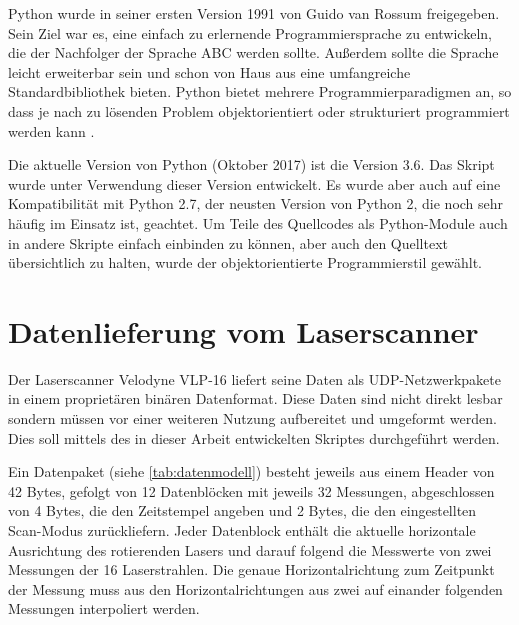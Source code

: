 \documentclass[a4paper,12pt,bibliography=totoc, listof=totoc,titlepage,pointlessnumbers]{scrreprt}
\begin{document}
Python wurde in seiner ersten Version 1991 von Guido van Rossum freigegeben. Sein Ziel war es, eine einfach zu erlernende Programmiersprache zu entwickeln, die der Nachfolger der Sprache ABC werden sollte. Außerdem sollte die Sprache leicht erweiterbar sein und schon von Haus aus eine umfangreiche Standardbibliothek bieten. Python bietet mehrere Programmierparadigmen an, so dass je nach zu lösenden Problem objektorientiert oder strukturiert programmiert werden kann \citep[S. 14]{python}.

Die aktuelle Version von Python (Oktober 2017) ist die Version 3.6. Das Skript wurde unter Verwendung dieser Version entwickelt. Es wurde aber auch auf eine Kompatibilität mit Python 2.7, der neusten Version von Python 2, die noch sehr häufig im Einsatz ist, geachtet. Um Teile des Quellcodes als Python-Module auch in andere Skripte einfach einbinden zu können, aber auch den Quelltext übersichtlich zu halten, wurde der objektorientierte Programmierstil gewählt.

\section{Datenlieferung vom Laserscanner}
\label{ss:Datenlieferung}
Der Laserscanner Velodyne VLP-16 liefert seine Daten als UDP-Netzwerkpakete in einem proprietären binären Datenformat. Diese Daten sind nicht direkt lesbar sondern müssen vor einer weiteren Nutzung aufbereitet und umgeformt werden. Dies soll mittels des in dieser Arbeit entwickelten Skriptes durchgeführt werden.

Ein Datenpaket (siehe \autoref{tab:datenmodell}) besteht jeweils aus einem Header von 42 Bytes, gefolgt von 12 Datenblöcken mit jeweils 32 Messungen, abgeschlossen von 4 Bytes, die den Zeitstempel angeben und 2 Bytes, die den eingestellten Scan-Modus zurückliefern. Jeder Datenblock enthält die aktuelle horizontale Ausrichtung des rotierenden Lasers und darauf folgend die Messwerte von zwei Messungen der 16 Laserstrahlen. Die genaue Horizontalrichtung zum Zeitpunkt der Messung muss aus den Horizontalrichtungen aus zwei auf einander folgenden Messungen interpoliert werden.
\end{document}
